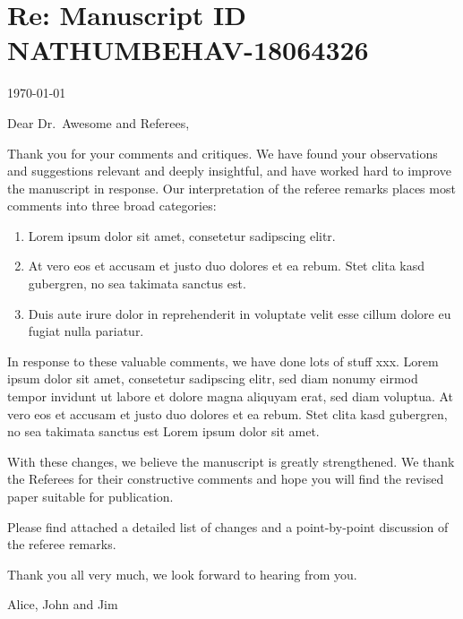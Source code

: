 \documentclass[11pt]{article}
\begin{document}
\section*{Re: Manuscript ID NATHUMBEHAV-18064326}
\thispagestyle{empty}

\today

Dear Dr.~Awesome and Referees,
   
Thank you for your comments and critiques. We have found your observations and
suggestions relevant and deeply insightful, and have worked hard to improve the
manuscript in response.  Our interpretation of the referee remarks places most
comments into three broad categories:\\[-5ex]
\begin{enumerate}\itemsep=0pt%
    \item Lorem ipsum dolor sit amet, consetetur sadipscing elitr.
    \item At vero eos et accusam et justo duo dolores et ea rebum. Stet clita
    kasd gubergren, no sea takimata sanctus est.
    \item Duis aute irure dolor in reprehenderit in voluptate velit esse cillum
    dolore eu fugiat nulla pariatur.
\end{enumerate}
\vspace{-1.5ex}


In response to these valuable comments, we have done lots of stuff xxx.
%
Lorem ipsum dolor sit amet, consetetur sadipscing elitr, sed diam nonumy
eirmod tempor invidunt ut labore et dolore magna aliquyam erat, sed diam
voluptua. At vero eos et accusam et justo duo dolores et ea rebum. Stet
clita kasd gubergren, no sea takimata sanctus est Lorem ipsum dolor sit
amet.

With these changes, we believe the manuscript is greatly strengthened. We thank
the Referees for their constructive comments and hope you will find the
revised paper suitable for publication.

Please find attached a detailed list of changes and a point-by-point discussion
of the referee remarks.

Thank you all very much, we look forward to hearing from you.
\vspace{1.5ex}

Alice, John and Jim
\clearpage 
\end{document}
